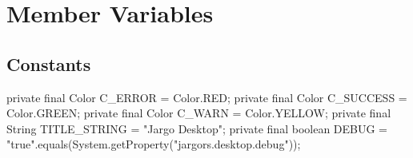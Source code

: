 \section{Member Variables}

\subsection{Constants}
\nwenddocs{}\endmoddef{}
private final Color C_ERROR   = Color.RED;
private final Color C_SUCCESS = Color.GREEN;
private final Color C_WARN    = Color.YELLOW;
private final String TITLE_STRING = "Jargo Desktop";
private final boolean DEBUG =
    "true".equals(System.getProperty("jargors.desktop.debug"));
\nwendcode{}\nwdocspar

